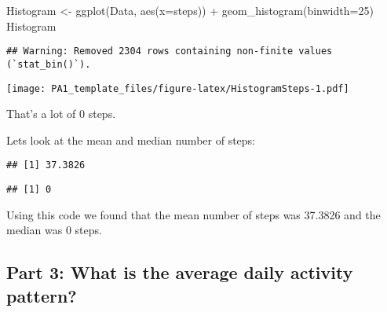 \documentclass[
]{article}
\newenvironment{Shaded}{\begin{snugshade}}{\end{snugshade}}
\newcommand{\AttributeTok}[1]{\textcolor[rgb]{0.77,0.63,0.00}{#1}}
\newcommand{\ConstantTok}[1]{\textcolor[rgb]{0.00,0.00,0.00}{#1}}
\newcommand{\DecValTok}[1]{\textcolor[rgb]{0.00,0.00,0.81}{#1}}
\newcommand{\FunctionTok}[1]{\textcolor[rgb]{0.00,0.00,0.00}{#1}}
\newcommand{\NormalTok}[1]{#1}
\newcommand{\OtherTok}[1]{\textcolor[rgb]{0.56,0.35,0.01}{#1}}
\newcommand{\SpecialCharTok}[1]{\textcolor[rgb]{0.00,0.00,0.00}{#1}}
\begin{document}
\begin{Shaded}
\begin{Highlighting}[]
\NormalTok{Histogram }\OtherTok{\textless{}{-}} \FunctionTok{ggplot}\NormalTok{(Data, }\FunctionTok{aes}\NormalTok{(}\AttributeTok{x=}\NormalTok{steps)) }\SpecialCharTok{+}
    \FunctionTok{geom\_histogram}\NormalTok{(}\AttributeTok{binwidth=}\DecValTok{25}\NormalTok{)}
\NormalTok{Histogram}
\end{Highlighting}
\end{Shaded}

\begin{verbatim}
## Warning: Removed 2304 rows containing non-finite values (`stat_bin()`).
\end{verbatim}

\texttt{[image: PA1\_template\_files/figure-latex/HistogramSteps-1.pdf]}

That's a lot of 0 steps.

Lets look at the mean and median number of steps:

\begin{Shaded}
\end{Shaded}

\begin{verbatim}
## [1] 37.3826
\end{verbatim}

\begin{Shaded}
\end{Shaded}

\begin{verbatim}
## [1] 0
\end{verbatim}

Using this code we found that the mean number of steps was 37.3826 and
the median was 0 steps.

\hypertarget{part-3-what-is-the-average-daily-activity-pattern}{%
\subsection{Part 3: What is the average daily activity
pattern?}\label{part-3-what-is-the-average-daily-activity-pattern}}
\end{document}
